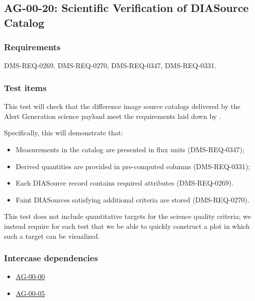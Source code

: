 \subsection{AG-00-20: Scientific Verification of DIASource Catalog}
\label{ag-00-20}

\subsubsection{Requirements}

DMS-REQ-0269, DMS-REQ-0270, DMS-REQ-0347, DMS-REQ-0331.

\subsubsection{Test items}
\label{ag-00-20-items}

This test will check that the difference image source catalogs 
delivered by the Alert Generation science
payload meet the requirements laid down by .

Specifically, this will demonstrate that:

\begin{itemize}

  \item{Measurements in the catalog are presented in flux units (DMS-REQ-0347);} 
  \item{Derived quantities are provided in pre-computed columns (DMS-REQ-0331);} 
\item{Each DIASource record contains required attributes
	(DMS-REQ-0269).}

\item{Faint DIASources satisfying additional criteria are stored
	(DMS-REQ-0270).}

\end{itemize}

This test does not include quantitative targets for the science quality criteria; we instead require for each test that we be able to quickly construct a plot in which such a target can be visualized.

\subsubsection{Intercase dependencies}

\begin{itemize}

  \item{\hyperref[ag-00-00]{AG-00-00}}
  \item{\hyperref[ag-00-05]{AG-00-05}}

\end{itemize}

